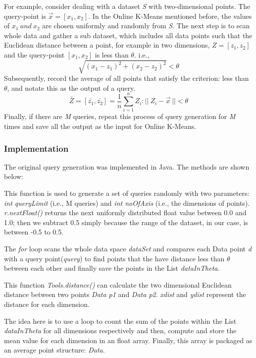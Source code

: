 \documentclass{lmproj}
\begin{document}
For example, consider dealing with a dataset \textit{S} with two-dimensional points. The query-point is $\vec{x} = [x_1,x_2] $. In the Online K-Means mentioned before, the values of $ x_1\ and\ x_2 $ are chosen uniformly and randomly from \textit{S}. The next step is to scan whole data and gather a sub dataset, which includes all data points such that the Euclidean distance between a point, for example in two dimensions, $ Z = [z_1,z_2]$ and the query-point $ [x_1,x_2] $ is less than  $ \theta $. i.e., $$ \sqrt{(x_1-z_1)^2 + (x_2-z_2)^2} < \theta $$ Subsequently, record the average of all points that satisfy the criterion: less than  $ \theta $, and notate this as the output of a query. $$ \bar Z = [\bar {z_1}, \bar {z_2}] = \frac{1}{n}{\sum_{i=1}^{n} Z_i}:||\ Z_i - \vec{x}\ ||<\theta $$ Finally, if there are \textit{M} queries, repeat this process of query generation for \textit{M} times and save all the output as the input for Online K-Means. 

\subsubsection{Implementation}
The original query generation was implemented in Java. The methods are shown below:



This function is used to generate a set of queries randomly with two parameters: \textit{int queryLimit} (i.e., M queries) and \textit{int noOfAxis} (i.e., the dimensions of points). \textit{r.nextFloat()} returns the next uniformly distributed float value between 0.0 and 1.0; then we subtract 0.5 simply because the range of the dataset, in our case, is between -0.5 to 0.5.


The \textit{for} loop scans the whole data space \textit{dataSet} and compares each Data point \textit{d} with a query point(\textit{query}) to find points that the have distance less than $ \theta $ between each other and finally save the points in the List \textit{dataInTheta}. 

This function \textit{Tools.distance()} can calculate the two dimensional Euclidean distance between two points \textit{Data p1} and \textit{Data p2}. \textit{xdist} and \textit{ydist} represent the distance for each dimension.

The idea here is to use a loop to count the sum of the points within the List \textit{dataInTheta} for all dimensions respectively and then, compute and store the mean value for each dimension in an float array. Finally, this array is packaged as an average point structure: \textit{Data}. 
\end{document}
